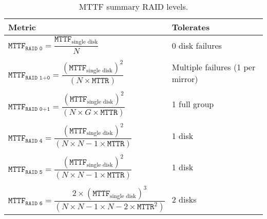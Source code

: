 \begin{table}[!htp]
    \centering
    \begin{tabular}{@{} l l @{}}
        \toprule
        \textbf{Metric}                                                                                                                                                         & \textbf{Tolerates} \\
        \midrule
        $\texttt{MTTF}_{\texttt{RAID 0}} = \dfrac{\texttt{MTTF}_{\text{single disk}}}{N}$                                                                                        & 0 disk failures \\ \\
        $\texttt{MTTF}_{\texttt{RAID 1+0}} = \dfrac{\left(\texttt{MTTF}_{\text{single disk}}\right)^{2}}{\left(N \times \texttt{MTTR}\right)}$                                   & Multiple failures (1 per mirror) \\ \\
        $\texttt{MTTF}_{\texttt{RAID 0+1}} = \dfrac{\left(\texttt{MTTF}_{\text{single disk}}\right)^{2}}{\left(N \times G \times \texttt{MTTR}\right)}$                          & 1 full group \\ \\
        $\texttt{MTTF}_{\texttt{RAID 4}} = \dfrac{\left(\texttt{MTTF}_{\text{single disk}}\right)^{2}}{\left(N \times N-1 \times \texttt{MTTR}\right)}$                          & 1 disk \\ \\
        $\texttt{MTTF}_{\texttt{RAID 5}} = \dfrac{\left(\texttt{MTTF}_{\text{single disk}}\right)^{2}}{\left(N \times N-1 \times \texttt{MTTR}\right)}$                          & 1 disk \\ \\
        $\texttt{MTTF}_{\texttt{RAID 6}} = \dfrac{2 \times \left(\texttt{MTTF}_{\text{single disk}}\right)^{3}}{\left(N \times N-1 \times N-2 \times \texttt{MTTR}^{2}\right)}$  & 2 disks \\
        \bottomrule
    \end{tabular}
    \caption{MTTF summary RAID levels.}
\end{table}

